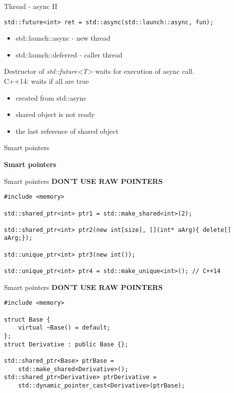 \documentclass{beamer}
\begin{document}
\begin{frame}[fragile]{Thread - async II} 
\begin{lstlisting}[style=customcpp]
std::future<int> ret = std::async(std::launch::async, fun);
\end{lstlisting}
\begin{itemize}
\item std::launch::async - new thread
\item std::launch::deferred - caller thread
\end{itemize}

Destructor of \textit{std::future<T>} waits for execution of async call.\\
C++14: waits if all are true
\begin{itemize}
\item created from std::async
\item shared object is not ready
\item the last reference of shared object
\end{itemize}
\end{frame}

\begin{frame}[fragile]{Smart pointers}
\begin{center}
{\Huge \textbf{Smart pointers}}
\end{center}
\end{frame}

\begin{frame}[fragile]{Smart pointers}
\textbf{DON'T USE RAW POINTERS}
\begin{lstlisting}[style=customcpp]
#include <memory>

std::shared_ptr<int> ptr1 = std::make_shared<int>(2);

std::shared_ptr<int> ptr2(new int[size], [](int* aArg){ delete[] aArg;});

std::unique_ptr<int> ptr3(new int()); 

std::unique_ptr<int> ptr4 = std::make_unique<int>(); // C++14
\end{lstlisting}
\end{frame}


\begin{frame}[fragile]{Smart pointers}
\textbf{DON'T USE RAW POINTERS}
\begin{lstlisting}[style=customcpp]
#include <memory>

struct Base {
	virtual ~Base() = default;
};
struct Derivative : public Base {};

std::shared_ptr<Base> ptrBase = 
	std::make_shared<Derivative>();
std::shared_ptr<Derivative> ptrDerivative = 
	std::dynamic_pointer_cast<Derivative>(ptrBase);
\end{lstlisting}
\end{frame}
\end{document}
